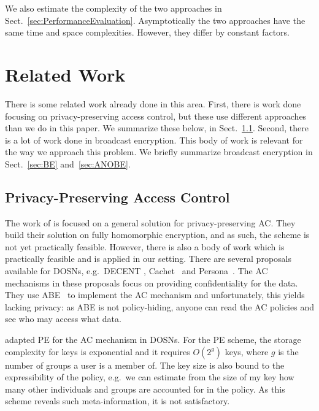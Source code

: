 We also estimate the complexity of the two approaches in 
Sect.~\ref{sec:PerformanceEvaluation}.
Asymptotically the two approaches have the same time and space complexities.
However, they differ by constant factors.


\section<article>{Related Work}\label{sec:RelatedWork}

There is some related work already done in this area.
First, there is work done focusing on privacy-preserving access control, but 
these use different approaches than we do in this paper.
We summarize these below, in Sect.~\ref{sec:PPAC}.
Second, there is a lot of work done in broadcast encryption.
This body of work is relevant for the way we approach this problem.
We briefly summarize broadcast encryption in Sect.~\ref{sec:BE} 
and~\ref{sec:ANOBE}.

\subsection<article>{Privacy-Preserving Access Control}\label{sec:PPAC}

The work of \citet{TowardsPPACwHPHCHD} is focused on a general solution for 
privacy-preserving \ac{AC}.
They build their solution on fully homomorphic encryption, and as such, the 
scheme is not yet practically feasible.
However, there is also a body of work which is practically feasible and is 
applied in our setting.
There are several proposals available for \acp{DOSN}, e.g.~DECENT
\cite{DECENT}, Cachet~\cite{Cachet} and Persona~\cite{Persona}.
The \ac{AC} mechanisms in these proposals focus on providing confidentiality 
for the data.
They use \ac{ABE}~\cite{abe} to implement the \ac{AC} mechanism and
unfortunately, this yields lacking privacy: as \ac{ABE} is not policy-hiding, 
anyone can read the \ac{AC} policies and see who may access what data.

\citet{PEAC} adapted \ac{PE} for the \ac{AC} mechanism in \acp{DOSN}.
For the \ac{PE} scheme, the storage complexity for keys is exponential and it 
requires \(O(2^g)\) keys, where \(g\) is the number of groups a user is 
a member of.
The key size is also bound to the expressibility of the policy, e.g.\ we can 
estimate from the size of my key how many other individuals and groups are 
accounted for in the policy.
As this scheme reveals such meta-information, it is not satisfactory.

